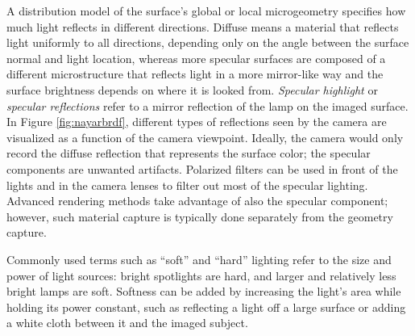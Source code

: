 A distribution model of the surface's global or local microgeometry specifies how much light reflects in different directions. \cite{nayar1991surface} %
Diffuse means a material that reflects light uniformly to all directions, depending only on the angle between the surface normal and light location, whereas more specular surfaces are composed of a different microstructure that reflects light in a more mirror-like way and the surface brightness depends on where it is looked from.
\emph{Specular highlight} or \emph{specular reflections} refer to a mirror reflection of the lamp on the imaged surface.
In Figure \ref{fig:nayarbrdf}, different types of reflections seen by the camera are visualized as a function of the camera viewpoint.
Ideally, the camera would only record the diffuse reflection that represents the surface color;
the specular components are unwanted artifacts.
Polarized filters can be used in front of the lights and in the camera lenses to filter out most of the specular lighting.
Advanced rendering methods take advantage of also the specular component; however, such material capture is typically done separately from the geometry capture.


Commonly used terms such as ``soft'' and ``hard'' lighting refer to the size and power of light sources: bright spotlights are hard, and larger and relatively less bright lamps are soft.
Softness can be added by increasing the light's area while holding its power constant, such as reflecting a light off a large surface or adding a white cloth between it and the imaged subject.
\cite[p. 108]{langford2000basic}

